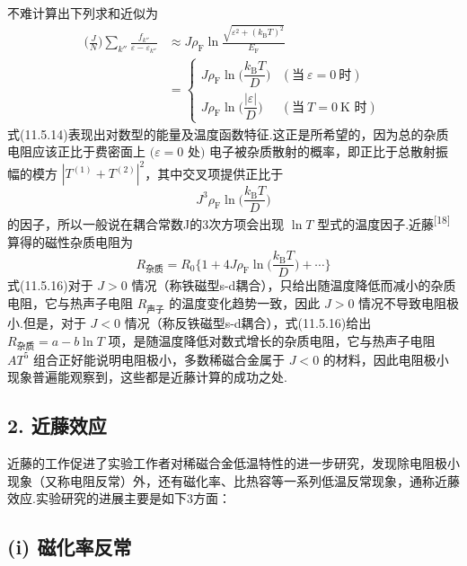 不难计算出下列求和近似为
\begin{equation}
\begin{aligned}
  \biggl(\frac{J}{N}\biggr)\sum_{k''}\frac{f_{k''}}{\varepsilon-\varepsilon_{k''}}
  &\approx J\rho_{\mathrm{F}}\ln
  \frac{\sqrt{\varepsilon^{2}+(k_{\mathrm{B}}T)^{2}}}{E_{\mathrm{F}}}\\
  &=\begin{cases}
    J\rho_{\mathrm{F}}\ln\biggl(\dfrac{k_{\mathrm{B}}T}{D}\biggr)
    & (\text{当}\ \varepsilon=0\ \text{时})\\[0.8em]
    J\rho_{\mathrm{F}}\ln\biggl(\dfrac{|\varepsilon|}{D}\biggr)
    & (\text{当}\ T=0\ \text{K 时})
  \end{cases}
\end{aligned}
\end{equation}
式(11.5.14)表现出对数型的能量及温度函数特征.这正是所希望的，因为总的杂质电阻应该正比于费密面上 $(\varepsilon=0$ 处$)$ 电子被杂质散射的概率，即正比于总散射振幅的模方 $|T^{(1)}+T^{(2)}|^{2}$，其中交叉项提供正比于
\begin{equation}
  J^{3}\rho_{\mathrm{F}}\ln\biggl(\frac{k_{\mathrm{B}}T}{D}\biggr)
\end{equation}
的因子，所以一般说在耦合常数J的3次方项会出现 $\ln T$ 型式的温度因子.近藤\textsuperscript{[18]}算得的磁性杂质电阻为
\begin{equation}
  R_{\text{杂质}}=R_{0}\biggl\{1+4J\rho_{\mathrm{F}}
  \ln\biggl(\frac{k_{\mathrm{B}}T}{D}\biggr)+\cdots\biggr\}
\end{equation}
式(11.5.16)对于 $J>0$ 情况（称铁磁型s-d耦合），只给出随温度降低而减小的杂质电阻，它与热声子电阻 $R_{\text{声子}}$ 的温度变化趋势一致，因此 $J>0$ 情况不导致电阻极小.但是，对于 $J<0$ 情况（称反铁磁型s-d耦合），式(11.5.16)给出 $R_{\text{杂质}}=a-b\ln T$ 项，是随温度降低对数式增长的杂质电阻，它与热声子电阻 $AT^{5}$ 组合正好能说明电阻极小，多数稀磁合金属于 $J<0$ 的材料，因此电阻极小现象普遍能观察到，这些都是近藤计算的成功之处.

\subsection*{2. 近藤效应}

近藤的工作促进了实验工作者对稀磁合金低温特性的进一步研究，发现除电阻极小现象（又称电阻反常）外，还有磁化率、比热容等一系列低温反常现象，通称近藤效应.实验研究的进展主要是如下3方面：

\subsection*{(i) 磁化率反常}

